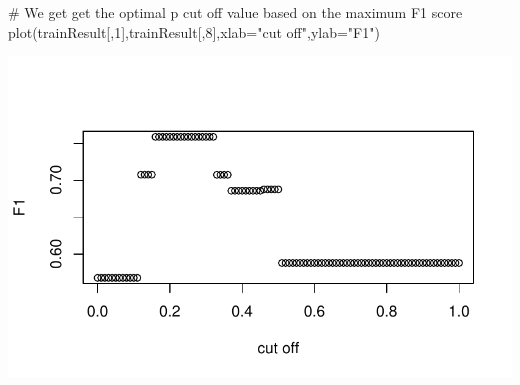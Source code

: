 \documentclass[
  letterpaper,
  DIV=11,
  numbers=noendperiod]{scrartcl}
\newenvironment{Shaded}{\begin{snugshade}}{\end{snugshade}}
\newcommand{\AttributeTok}[1]{\textcolor[rgb]{0.40,0.45,0.13}{#1}}
\newcommand{\CommentTok}[1]{\textcolor[rgb]{0.37,0.37,0.37}{#1}}
\newcommand{\DecValTok}[1]{\textcolor[rgb]{0.68,0.00,0.00}{#1}}
\newcommand{\FunctionTok}[1]{\textcolor[rgb]{0.28,0.35,0.67}{#1}}
\newcommand{\NormalTok}[1]{\textcolor[rgb]{0.00,0.23,0.31}{#1}}
\newcommand{\StringTok}[1]{\textcolor[rgb]{0.13,0.47,0.30}{#1}}
\begin{document}
\begin{Shaded}
\begin{Highlighting}[]
\CommentTok{\# We get get the optimal p cut off value based on the maximum F1 score}
\FunctionTok{plot}\NormalTok{(trainResult[,}\DecValTok{1}\NormalTok{],trainResult[,}\DecValTok{8}\NormalTok{],}\AttributeTok{xlab=}\StringTok{"cut off"}\NormalTok{,}\AttributeTok{ylab=}\StringTok{"F1"}\NormalTok{)}
\end{Highlighting}
\end{Shaded}

\includegraphics{FinalProject_files/figure-pdf/poisson-1.pdf}
\end{document}
